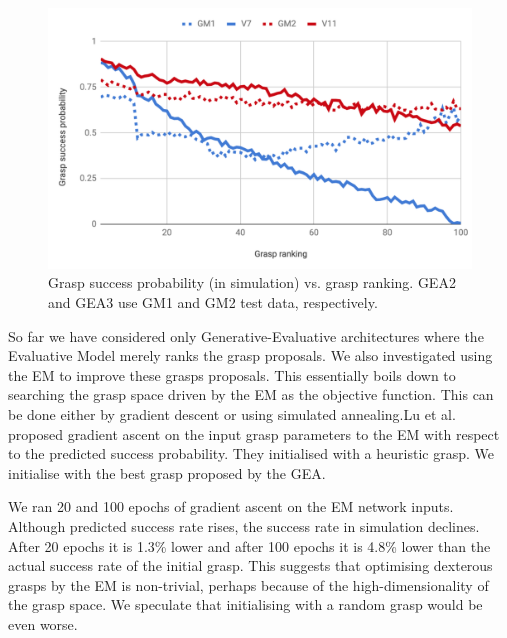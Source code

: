 \begin{figure}[t]
  \includegraphics[width=\linewidth]{images/successvsranking.pdf}
  \caption{Grasp success probability (in simulation) vs. grasp ranking. GEA2 and GEA3 use GM1 and GM2 test data, respectively.}
  \label{fig:successvsranking}
\end{figure}

So far we have considered only Generative-Evaluative architectures where the Evaluative Model merely ranks the grasp proposals. We also investigated using the EM to improve these grasps proposals. This essentially boils down to searching the grasp space driven by the EM as the objective function. This can be done either by gradient descent or using simulated annealing.Lu et al. \cite{lu2017planning} proposed gradient ascent on the input grasp parameters to the EM with respect to the predicted success probability. They initialised with a heuristic grasp. We initialise with the best grasp proposed by the GEA. 

We ran 20 and 100 epochs of gradient ascent on the EM network inputs. Although predicted success rate rises, the success rate in simulation declines. After 20 epochs it is 1.3\% lower and after 100 epochs it is 4.8\% lower than the actual success rate of the initial grasp. This suggests that optimising dexterous grasps by the EM is non-trivial, perhaps because of the high-dimensionality of the grasp space. We speculate that initialising with a random grasp would be even worse.

